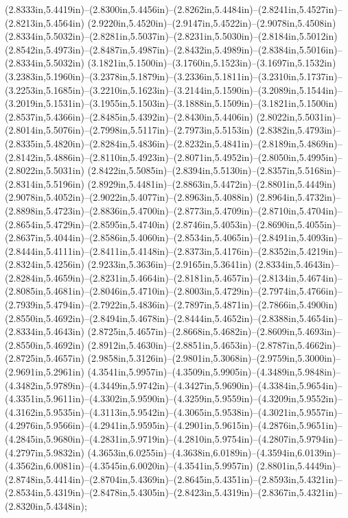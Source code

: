 (2.8333in,5.4419in)--(2.8300in,5.4456in)--(2.8262in,5.4484in)--(2.8241in,5.4527in)--(2.8213in,5.4564in) (2.9220in,5.4520in)--(2.9147in,5.4522in)--(2.9078in,5.4508in) (2.8334in,5.5032in)--(2.8281in,5.5037in)--(2.8231in,5.5030in)--(2.8184in,5.5012in) (2.8542in,5.4973in)--(2.8487in,5.4987in)--(2.8432in,5.4989in)--(2.8384in,5.5016in)--(2.8334in,5.5032in) (3.1821in,5.1500in)--(3.1760in,5.1523in)--(3.1697in,5.1532in) (3.2383in,5.1960in)--(3.2378in,5.1879in)--(3.2336in,5.1811in)--(3.2310in,5.1737in)--(3.2253in,5.1685in)--(3.2210in,5.1623in)--(3.2144in,5.1590in)--(3.2089in,5.1544in)--(3.2019in,5.1531in)--(3.1955in,5.1503in)--(3.1888in,5.1509in)--(3.1821in,5.1500in) (2.8537in,5.4366in)--(2.8485in,5.4392in)--(2.8430in,5.4406in) (2.8022in,5.5031in)--(2.8014in,5.5076in)--(2.7998in,5.5117in)--(2.7973in,5.5153in) (2.8382in,5.4793in)--(2.8335in,5.4820in)--(2.8284in,5.4836in)--(2.8232in,5.4841in)--(2.8189in,5.4869in)--(2.8142in,5.4886in)--(2.8110in,5.4923in)--(2.8071in,5.4952in)--(2.8050in,5.4995in)--(2.8022in,5.5031in) (2.8422in,5.5085in)--(2.8394in,5.5130in)--(2.8357in,5.5168in)--(2.8314in,5.5196in) (2.8929in,5.4481in)--(2.8863in,5.4472in)--(2.8801in,5.4449in) (2.9078in,5.4052in)--(2.9022in,5.4077in)--(2.8963in,5.4088in) (2.8964in,5.4732in)--(2.8898in,5.4723in)--(2.8836in,5.4700in)--(2.8773in,5.4709in)--(2.8710in,5.4704in)--(2.8654in,5.4729in)--(2.8595in,5.4740in) (2.8746in,5.4053in)--(2.8690in,5.4055in)--(2.8637in,5.4044in)--(2.8586in,5.4060in)--(2.8534in,5.4065in)--(2.8491in,5.4093in)--(2.8444in,5.4111in)--(2.8411in,5.4148in)--(2.8373in,5.4176in)--(2.8352in,5.4219in)--(2.8324in,5.4256in) (2.9233in,5.3636in)--(2.9165in,5.3641in) (2.8334in,5.4643in)--(2.8284in,5.4659in)--(2.8231in,5.4664in)--(2.8181in,5.4657in)--(2.8134in,5.4674in)--(2.8085in,5.4681in)--(2.8046in,5.4710in)--(2.8003in,5.4729in)--(2.7974in,5.4766in)--(2.7939in,5.4794in)--(2.7922in,5.4836in)--(2.7897in,5.4871in)--(2.7866in,5.4900in) (2.8550in,5.4692in)--(2.8494in,5.4678in)--(2.8444in,5.4652in)--(2.8388in,5.4654in)--(2.8334in,5.4643in) (2.8725in,5.4657in)--(2.8668in,5.4682in)--(2.8609in,5.4693in)--(2.8550in,5.4692in) (2.8912in,5.4630in)--(2.8851in,5.4653in)--(2.8787in,5.4662in)--(2.8725in,5.4657in) (2.9858in,5.3126in)--(2.9801in,5.3068in)--(2.9759in,5.3000in)--(2.9691in,5.2961in) (4.3541in,5.9957in)--(4.3509in,5.9905in)--(4.3489in,5.9848in)--(4.3482in,5.9789in)--(4.3449in,5.9742in)--(4.3427in,5.9690in)--(4.3384in,5.9654in)--(4.3351in,5.9611in)--(4.3302in,5.9590in)--(4.3259in,5.9559in)--(4.3209in,5.9552in)--(4.3162in,5.9535in)--(4.3113in,5.9542in)--(4.3065in,5.9538in)--(4.3021in,5.9557in)--(4.2976in,5.9566in)--(4.2941in,5.9595in)--(4.2901in,5.9615in)--(4.2876in,5.9651in)--(4.2845in,5.9680in)--(4.2831in,5.9719in)--(4.2810in,5.9754in)--(4.2807in,5.9794in)--(4.2797in,5.9832in) (4.3653in,6.0255in)--(4.3638in,6.0189in)--(4.3594in,6.0139in)--(4.3562in,6.0081in)--(4.3545in,6.0020in)--(4.3541in,5.9957in) (2.8801in,5.4449in)--(2.8748in,5.4414in)--(2.8704in,5.4369in)--(2.8645in,5.4351in)--(2.8593in,5.4321in)--(2.8534in,5.4319in)--(2.8478in,5.4305in)--(2.8423in,5.4319in)--(2.8367in,5.4321in)--(2.8320in,5.4348in);
